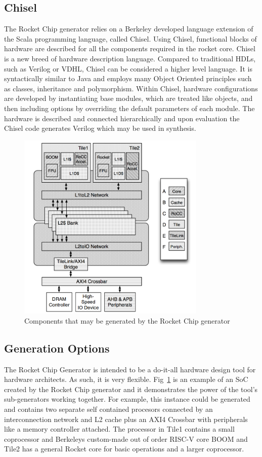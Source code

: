 \documentclass[journal]{IEEEtran}
\begin{document}
\subsection{Chisel}
The Rocket Chip generator relies on a Berkeley developed language extension of the Scala programming language, called Chisel\cite{bachrach2012chisel}. Using Chisel, functional blocks of hardware are described for all the components required in the rocket core. Chisel is a new breed of hardware description language. Compared to traditional HDLs, such as Verilog or VDHL, Chisel can be considered a higher level language. It is syntactically similar to Java and employs many Object Oriented principles such as classes, inheritance and polymorphism. Within Chisel, hardware configurations are developed by instantiating base modules, which are treated like objects, and then including options by overriding the default parameters of each module. The hardware is described and connected hierarchically and upon evaluation the Chisel code generates Verilog which may be used in synthesis.

\begin{figure} %
\centering
\includegraphics[width=9cm ]{./graphics/ExampleRocketChip.png}
\centering
\caption{Components that may be generated by the Rocket Chip generator}
\label{fig:rocketchip}
\end{figure}

\subsection{Generation Options}
The Rocket Chip Generator is intended to be a do-it-all hardware design tool for hardware architects. As such, it is very flexible. Fig~\ref{fig:rocketchip} is an example of an SoC created by the Rocket Chip generator and it demonstrates the power of the tool's sub-generators working together. For example, this instance could be generated and contains two separate self contained procesors connected by an interconnection network and L2 cache plus an AXI4 Crossbar with peripherals like a memory controller attached. The processor in Tile1 contains a small coprocessor and Berkeleys custom-made out of order RISC-V core BOOM and Tile2 has a general Rocket core for basic operations and a larger coprocessor.
\end{document}
